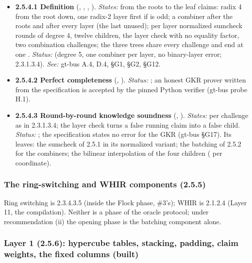\begin{itemize}[label={}, leftmargin=1.3em, itemindent=-1.3em, labelwidth=0pt, labelsep=0pt, itemsep=4pt, topsep=3pt]
\item {}\label{obl:node-2.5.4.1}\oblflag\textbf{2.5.4.1 Definition} (, , , ). \emph{States:} from the roots to the leaf claims: radix 4 from the root down, one radix-2 layer first if  is odd; a combiner after the roots and after every layer (the last unused); per layer  normalized sumcheck rounds of degree 4, twelve children, the layer check  with no equality factor, two combination challenges; the three trees share every challenge and end at one . \emph{Status:}   (degree 5, one combiner per layer, no binary-layer error; 2.3.1.3.4). \emph{See:} gt-bus A.4, D.4, §G1, §G2, §G12.
\item {}\label{obl:node-2.5.4.2}\textbf{2.5.4.2 Perfect completeness} (, ). \emph{Status:} ; an honest GKR prover written from the specification is accepted by the pinned Python verifier (gt-bus probe H.1).
\item {}\label{obl:node-2.5.4.3}\textbf{2.5.4.3 Round-by-round knowledge soundness} (, ). \emph{States:} per challenge as in 2.3.1.3.4; the layer check turns a false running claim into a false child. \emph{Status:} ; the specification states no error for the GKR (gt-bus §G17). Its leaves: the sumcheck of 2.5.1 in its normalized variant; the batching of 2.5.2 for the combiners; the bilinear interpolation of the four children ( per coordinate).
\end{itemize}

\subsubsection{The ring-switching and WHIR components (2.5.5)}\label{sec:obl-gen-rs-whir}

Ring switching is 2.3.4.3.5 (inside the Flock phase, \#3's); WHIR is 2.1.2.4 (Layer 11, the compilation). Neither is a phase of the oracle protocol; under recommendation (ii) the opening phase is the batching component alone.


\subsubsection[Layer 1 (2.5.6)]{Layer 1 (2.5.6): hypercube tables, stacking, padding, claim weights, the fixed columns (built)}\label{sec:obl-gen-layer1}

